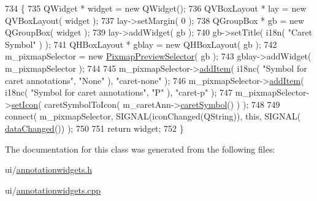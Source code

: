 \begin{DoxyCode}
734 \{
735     QWidget * widget = \textcolor{keyword}{new} QWidget();
736     QVBoxLayout * lay = \textcolor{keyword}{new} QVBoxLayout( widget );
737     lay->setMargin( 0 );
738     QGroupBox * gb = \textcolor{keyword}{new} QGroupBox( widget );
739     lay->addWidget( gb );
740     gb->setTitle( i18n( \textcolor{stringliteral}{"Caret Symbol"} ) );
741     QHBoxLayout * gblay = \textcolor{keyword}{new} QHBoxLayout( gb );
742     m\_pixmapSelector = \textcolor{keyword}{new} \hyperlink{classPixmapPreviewSelector}{PixmapPreviewSelector}( gb );
743     gblay->addWidget( m\_pixmapSelector );
744 
745     m\_pixmapSelector->\hyperlink{classPixmapPreviewSelector_ac4729c46cc585aba462dd2eebcb74a92}{addItem}( i18nc( \textcolor{stringliteral}{"Symbol for caret annotations"}, \textcolor{stringliteral}{"None"} ), \textcolor{stringliteral}{"caret-none"} );
746     m\_pixmapSelector->\hyperlink{classPixmapPreviewSelector_ac4729c46cc585aba462dd2eebcb74a92}{addItem}( i18nc( \textcolor{stringliteral}{"Symbol for caret annotations"}, \textcolor{stringliteral}{"P"} ), \textcolor{stringliteral}{"caret-p"} );
747     m\_pixmapSelector->\hyperlink{classPixmapPreviewSelector_a9ba6710637ffc9b0f5c8eac83aaec671}{setIcon}( caretSymbolToIcon( m\_caretAnn->\hyperlink{classOkular_1_1CaretAnnotation_ac328095a16f32e9039d917d7ee2774dc}{caretSymbol}() ) );
748 
749     connect( m\_pixmapSelector, SIGNAL(iconChanged(QString)), \textcolor{keyword}{this}, SIGNAL(
      \hyperlink{classAnnotationWidget_af9dcb02a8b69a602225c9844b5deb6d4}{dataChanged}()) );
750 
751     \textcolor{keywordflow}{return} widget;
752 \}
\end{DoxyCode}


The documentation for this class was generated from the following files\+:\begin{DoxyCompactItemize}
\item 
ui/\hyperlink{annotationwidgets_8h}{annotationwidgets.\+h}\item 
ui/\hyperlink{annotationwidgets_8cpp}{annotationwidgets.\+cpp}\end{DoxyCompactItemize}
